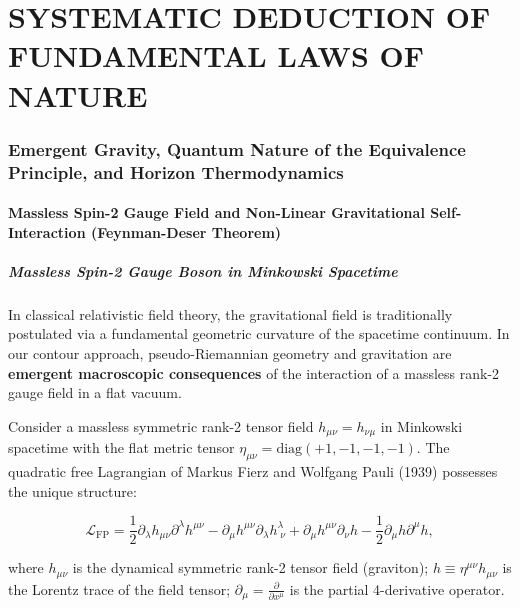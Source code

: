 \part{SYSTEMATIC DEDUCTION OF FUNDAMENTAL LAWS OF NATURE}\label{part:2}

\section{Emergent Gravity, Quantum Nature of the Equivalence Principle, and Horizon Thermodynamics}\label{sec:rozdil2}

\subsection{Massless Spin-2 Gauge Field and Non-Linear Gravitational Self-Interaction (Feynman-Deser Theorem)}\label{sec:2.1}

\subsubsection{Massless Spin-2 Gauge Boson in Minkowski Spacetime}\label{sec:2.1.1}

In classical relativistic field theory, the gravitational field is traditionally postulated via a fundamental geometric curvature of the spacetime continuum. In our contour approach, pseudo-Riemannian geometry and gravitation are \textbf{emergent macroscopic consequences} of the interaction of a massless rank-2 gauge field in a flat vacuum.

Consider a massless symmetric rank-2 tensor field $h_{\mu\nu} = h_{\nu\mu}$ in Minkowski spacetime with the flat metric tensor $\eta_{\mu\nu} = \text{diag}(+1, -1, -1, -1)$. The quadratic free Lagrangian of Markus Fierz and Wolfgang Pauli (1939) possesses the unique structure:

\begin{equation}\label{eq:2.1}\tag{2.1}
\mathcal{L}_{\text{FP}} = \frac{1}{2} \partial_\lambda h_{\mu\nu} \partial^\lambda h^{\mu\nu} - \partial_\mu h^{\mu\nu} \partial_\lambda h^\lambda_{\;\nu} + \partial_\mu h^{\mu\nu} \partial_\nu h - \frac{1}{2} \partial_\mu h \partial^\mu h,
\end{equation}

where $h_{\mu\nu}$ is the dynamical symmetric rank-2 tensor field (graviton);  
$h \equiv \eta^{\mu\nu} h_{\mu\nu}$ is the Lorentz trace of the field tensor;  
$\partial_\mu = \frac{\partial}{\partial x^\mu}$ is the partial 4-derivative operator.

